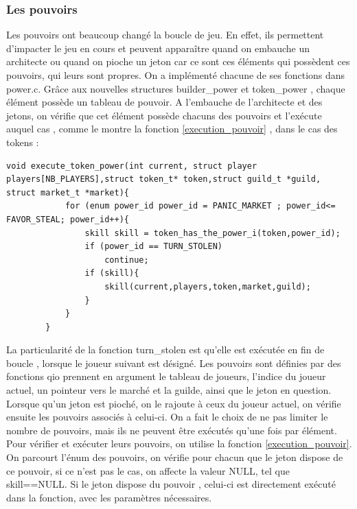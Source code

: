 \documentclass{article}
\begin{document}
        \subsubsection{Les pouvoirs}
        \hspace{1em} Les pouvoirs ont beaucoup changé la boucle de jeu. En effet, ils permettent d'impacter le jeu en cours et peuvent apparaître quand on embauche un architecte ou quand on pioche un jeton car ce sont ces éléments qui possèdent ces pouvoirs, qui leurs sont propres. On a implémenté chacune de ses fonctions dans power.c. Grâce aux nouvelles structures builder\_power et token\_power , chaque élément possède un tableau de pouvoir. A l'embauche de l'architecte et des jetons, on vérifie que cet élément possède chacuns des pouvoirs et l'exécute auquel cas , comme le montre la fonction \ref{execution_pouvoir} , dans le cas des tokens :
        
         \begin{lstlisting}[frame=single, caption={Fonction d'exécution des pouvoirs associés à un jeton},label={execution_pouvoir}]
           void execute_token_power(int current, struct player players[NB_PLAYERS],struct token_t* token,struct guild_t *guild, struct market_t *market){
        	for (enum power_id power_id = PANIC_MARKET ; power_id<= FAVOR_STEAL; power_id++){
        		skill skill = token_has_the_power_i(token,power_id);
        		if (power_id == TURN_STOLEN) 
        			continue;
        		if (skill){
        			skill(current,players,token,market,guild);
        		}
        	}
        }
         \end{lstlisting}
        
         La particularité de la fonction turn\_stolen est qu'elle est exécutée en fin de boucle , lorsque le joueur suivant est désigné. Les pouvoirs sont définies par des fonctions qio prennent en argument le tableau de joueurs, l'indice du joueur actuel, un pointeur vers le marché et la guilde, ainsi que le jeton en question. Lorsque qu'un jeton est pioché, on le rajoute à ceux du joueur actuel, on vérifie ensuite les pouvoirs associés à celui-ci. On a fait le choix de ne pas limiter le nombre de pouvoirs, mais ils ne peuvent être exécutés qu'une fois par élément. Pour vérifier et exécuter leurs pouvoirs, on utilise la fonction  \ref{execution_pouvoir}. On parcourt l'énum des pouvoirs, on vérifie pour chacun que le jeton dispose de ce pouvoir, si ce n'est pas le cas, on affecte la valeur NULL, tel que skill==NULL. Si le jeton dispose du pouvoir , celui-ci est directement exécuté dans la fonction, avec les paramètres nécessaires.
            
\end{document}
